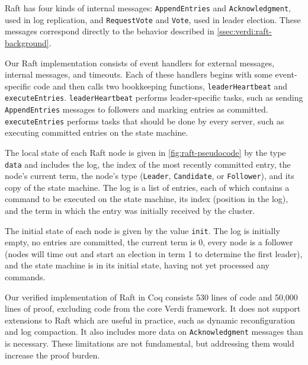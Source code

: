 Raft has four kinds of internal messages:
\texttt{AppendEntries} and \texttt{Acknowledgment},
used in log replication,
and \texttt{RequestVote} and \texttt{Vote},
used in leader election.
These messages correspond directly to the behavior described
in \cref{ssec:verdi:raft-background}.

\begin{sloppypar}
Our Raft implementation consists of event handlers
for external messages, internal messages, and timeouts.
Each of these handlers begins with some event-specific code
and then calls two bookkeeping functions,
\texttt{leaderHeartbeat} and \texttt{executeEntries}.
\texttt{leaderHeartbeat} performs leader-specific tasks,
such as sending \texttt{AppendEntries} messages to followers
and marking entries as committed.
\texttt{executeEntries} performs tasks
that should be done by every server,
such as executing committed entries on the state machine.
\end{sloppypar}


The local state of each Raft node is given in \cref{fig:raft-pseudocode}
by the type \texttt{data}
and includes the log,
the index of the most recently committed entry,
the node's current term,
the node's type (\texttt{Leader}, \texttt{Candidate}, or \texttt{Follower}),
and its copy of the state machine.
The log is a list of entries,
each of which contains
a command to be executed on the state machine,
its index (position in the log),
and the term in which the entry was initially received by the cluster.

The initial state of each node is given
  by the value \texttt{init}.
The log is initially empty,
  no entries are committed,
  the current term is 0,
  every node is a follower
  (nodes will time out and start an election in term 1 to determine the first leader),
  and the state machine is in its initial state,
  having not yet processed any commands.

Our verified implementation of Raft in Coq
  consists 530 lines of code
  and 50,000 lines of proof,
  excluding code from
  the core Verdi framework. It does not support extensions to Raft
  which are useful in practice, such as dynamic reconfiguration and
  log compaction. It also includes more data on \texttt{Acknowledgment}
  messages than is necessary. These limitations are not fundamental,
  but addressing them would increase the proof burden.

